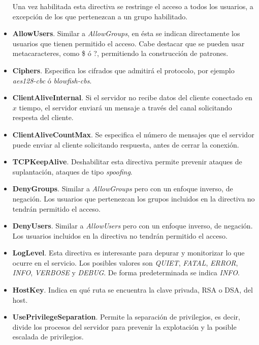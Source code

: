 \documentclass[a4paper, 11pt, titlepage]{article}
\begin{document}
\begin{itemize}
            Una vez habilitada esta directiva se restringe el acceso a todos los usuarios, a excepción de los que
            pertenezcan a un grupo habilitado.
            \item \textbf{AllowUsers}. Similar a \textit{AllowGroups}, en ésta se indican directamente los usuarios 
            que tienen permitido el acceso. Cabe destacar que se pueden usar metacaracteres, como \$ ó ?, permitiendo 
            la construcción de patrones.
            \item \textbf{Ciphers}. Especifica los cifrados que admitirá el protocolo, por ejemplo 
            \textit{aes128-cbc} ó \textit{blowfish-cbs}.
            \item \textbf{ClientAliveInternal}. Si el servidor no recibe datos del cliente conectado en $x$ tiempo, el 
            servidor enviará un mensaje a través del canal solicitando respesta del cliente.
            \item \textbf{ClientAliveCountMax}. Se especifica el número de mensajes que el servidor puede enviar al cliente 
            solicitando respuesta, antes de cerrar la conexión. 
            \item \textbf{TCPKeepAlive}. Deshabilitar esta directiva permite prevenir ataques de 
            suplantación, ataques de tipo \textit{spoofing}.
            \item \textbf{DenyGroups}. Similar a \textit{AllowGroups} pero con un enfoque inverso, de negación. Los usuarios 
            que pertenezcan los grupos incluidos en la directiva no tendrán permitido el acceso.
            \item \textbf{DenyUsers}. Similar a \textit{AllowUsers} pero con un enfoque inverso, de negación. Los usuarios 
            incluidos en la directiva no tendrán permitido el acceso.
            \item \textbf{LogLevel}. Esta directiva es interesante para depurar y monitorizar lo que ocurre en el servicio.
            Los posibles valores son \textit{QUIET}, \textit{FATAL}, \textit{ERROR}, \textit{INFO}, \textit{VERBOSE} y 
            \textit{DEBUG}. De forma predeterminada se indica \textit{INFO}.
            \item \textbf{HostKey}. Indica en qué ruta se encuentra la clave privada, RSA o DSA, del host.
            \item \textbf{UsePrivilegeSeparation}. Permite la separación de privilegios, es decir, divide los procesos del 
            servidor para prevenir la explotación y la posible escalada de privilegios.

\end{itemize}
\end{document}
